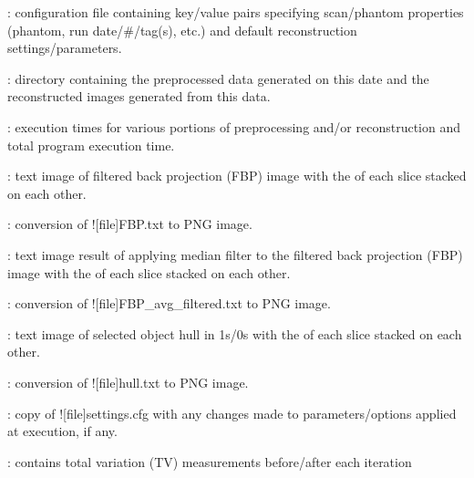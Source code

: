 \begin{tcbenvironment}
\begin{tcbparagraph}
\begin{ThinEnum}
\begin{ThinEnum}
\begin{ThinEnum}
\begin{ThinEnum}
\begin{ThinEnum}
\begin{ThinEnum}
\begin{ThinEnum}
                               \begin{ThinEnum}
                                    \item {} : configuration file containing key/value pairs specifying scan/phantom properties
                                    (phantom, run date/\#/tag(s), etc.) and default reconstruction settings/parameters.
                    				\item {} : directory containing the preprocessed data generated on this date and the reconstructed images generated from this data.
                                    \begin{ThinEnum}
                                        	\item {} : execution times for various portions of preprocessing and/or reconstruction and total program execution time.
                                        	\item {} : text image of filtered back projection (FBP) image with the \xyplane* of each slice stacked on each other.
                                        	\item {} : conversion of \docentry![file]{FBP.txt} to PNG image.
                                        	\item {} : text image result of applying median filter to the filtered back projection (FBP) image with the \xyplane* of each slice stacked on each other.
                                        	\item {} : conversion of \docentry![file]{FBP\_avg\_filtered.txt} to PNG image.
                                        	\item {} : text image of selected object hull in 1s/0s with the \xyplane* of each slice stacked on each other.
                                        	\item {} : conversion of \docentry![file]{hull.txt} to PNG image.
                                        	\item {} : copy of \docentry![file]{settings.cfg} with any changes made to parameters/options applied at execution, if any.
                                        	\item {} : contains total variation (TV) measurements before/after each iteration

\end{ThinEnum}
\end{ThinEnum}
\end{ThinEnum}
\end{ThinEnum}
\end{ThinEnum}
\end{ThinEnum}
\end{ThinEnum}
\end{ThinEnum}
\end{ThinEnum}
\end{tcbparagraph}
\end{tcbenvironment}
